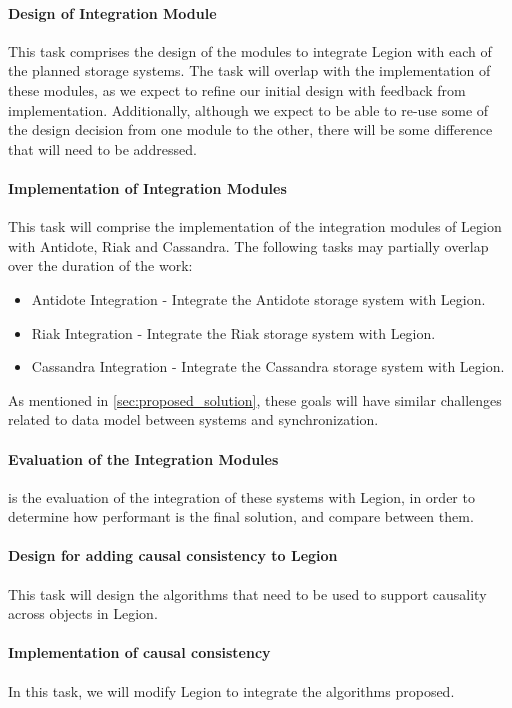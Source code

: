 \paragraph{Design of Integration Module} This task comprises the design of the modules to integrate Legion with each of the planned storage systems. The task will overlap with the implementation of these modules, as we expect to refine our initial design with feedback from implementation. Additionally, although we expect to be able to re-use some of the design decision from one module to the other, there will be some difference that will need to be addressed.

\paragraph{Implementation of Integration Modules} This task will comprise the implementation of the integration modules of Legion with Antidote, Riak and Cassandra. The following tasks may partially overlap over the duration of the work:
\begin{itemize}
\item Antidote Integration - Integrate the Antidote storage system with Legion.
\item Riak Integration - Integrate the Riak storage system with Legion.
\item Cassandra Integration - Integrate the Cassandra storage system with Legion.
\end{itemize}
As mentioned in \ref{sec:proposed_solution}, these goals will have similar challenges related to data model between systems and synchronization.

\paragraph{Evaluation of the Integration Modules} is the evaluation of the integration of these systems with Legion, in order to determine how performant is the final solution, and compare between them.

\paragraph{Design for adding causal consistency to Legion} This task will design the algorithms that need to be used to support causality across objects in Legion.

\paragraph{Implementation of causal consistency} In this task, we will modify Legion to integrate the algorithms proposed.

